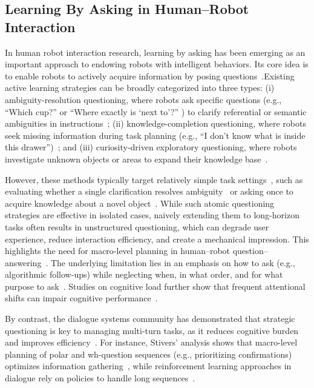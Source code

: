 \documentclass[sigconf,authordraft]{acmart}
\begin{document}
\subsection{Learning By Asking in Human–Robot Interaction}
In human robot interaction research, learning by asking has been emerging as an important approach to endowing robots with intelligent behaviors. Its core idea is to enable robots to actively acquire information by posing questions~\cite{hu2025task,shen2025elba}.Existing active learning strategies can be broadly categorized into three types: 
(i) ambiguity-resolution questioning, where robots ask specific questions (e.g., ``Which cup?'' or ``Where exactly is `next to'?'' ) to clarify referential or semantic ambiguities in instructions~\cite{3ren2023robots,4andukuri2024star,5ramrakhya2025grounding,6padmakumar2022teach}; 
(ii) knowledge-completion questioning, where robots seek missing information during task planning (e.g., ``I don't know what is inside this drawer'')~\cite{hu2025task,7uehara2024learning}; 
and (iii) curiosity-driven exploratory questioning, where robots investigate unknown objects or areas to expand their knowledge base~\cite{8leusmann2025investigating,9carter2022you,10leusmann2025developing,11scialom2019ask}.

However, these methods typically target relatively simple task settings~\cite{7uehara2024learning,12biyik2019asking,13gonzalez2018analyzing}, such as evaluating whether a single clarification resolves ambiguity~\cite{5ramrakhya2025grounding,7uehara2024learning} or asking once to acquire knowledge about a novel object~\cite{12biyik2019asking,shen2019learning}. While such atomic questioning strategies are effective in isolated cases, naively extending them to long-horizon tasks often results in unstructured questioning, which can degrade user experience, reduce interaction efficiency, and create a mechanical impression. This highlights the need for macro-level planning in human--robot question--answering~\cite{oviatt2006human,kosch2023survey,tyshka2023interactive}. The underlying limitation lies in an emphasis on how to ask (e.g., algorithmic follow-ups) while neglecting when, in what order, and for what purpose to ask~\cite{tyshka2023interactive,hu2024designing}. Studies on cognitive load further show that frequent attentional shifts can impair cognitive performance~\cite{kosch2023survey}.

By contrast, the dialogue systems community has demonstrated that strategic questioning is key to managing multi-turn tasks, as it reduces cognitive burden and improves efficiency~\cite{stivers2010overview,kwan2023survey}. For instance, Stivers' analysis shows that macro-level planning of polar and wh-question sequences (e.g., prioritizing confirmations) optimizes information gathering~\cite{stivers2010overview}, while reinforcement learning approaches in dialogue rely on policies to handle long sequences~\cite{kwan2023survey}.
\end{document}
